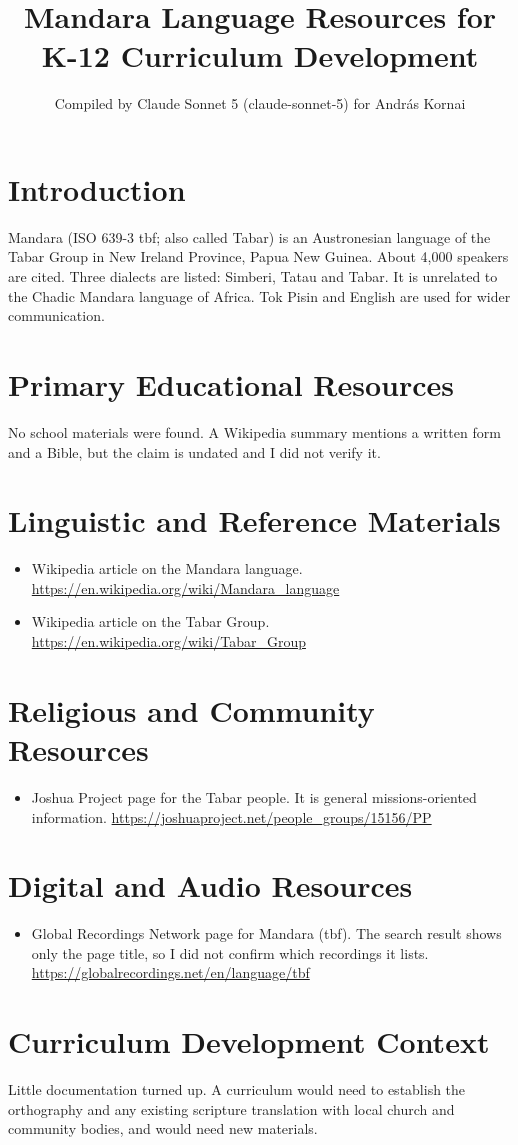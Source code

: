 \documentclass[12pt]{article}
\title{Mandara Language Resources for K-12 Curriculum Development}
\author{Compiled by Claude Sonnet 5 (claude-sonnet-5) for Andr\'as Kornai}
\date{}
\begin{document}
\maketitle

\section{Introduction}
Mandara (ISO 639-3 tbf; also called Tabar) is an Austronesian language of the Tabar Group in New Ireland Province, Papua New Guinea. About 4,000 speakers are cited. Three dialects are listed: Simberi, Tatau and Tabar. It is unrelated to the Chadic Mandara language of Africa. Tok Pisin and English are used for wider communication.

\section{Primary Educational Resources}
No school materials were found. A Wikipedia summary mentions a written form and a Bible, but the claim is undated and I did not verify it.

\section{Linguistic and Reference Materials}
\begin{itemize}
\item Wikipedia article on the Mandara language. \url{https://en.wikipedia.org/wiki/Mandara_language}
\item Wikipedia article on the Tabar Group. \url{https://en.wikipedia.org/wiki/Tabar_Group}
\end{itemize}

\section{Religious and Community Resources}
\begin{itemize}
\item Joshua Project page for the Tabar people. It is general missions-oriented information. \url{https://joshuaproject.net/people_groups/15156/PP}
\end{itemize}

\section{Digital and Audio Resources}
\begin{itemize}
\item Global Recordings Network page for Mandara (tbf). The search result shows only the page title, so I did not confirm which recordings it lists. \url{https://globalrecordings.net/en/language/tbf}
\end{itemize}

\section{Curriculum Development Context}
Little documentation turned up. A curriculum would need to establish the orthography and any existing scripture translation with local church and community bodies, and would need new materials.
\end{document}

